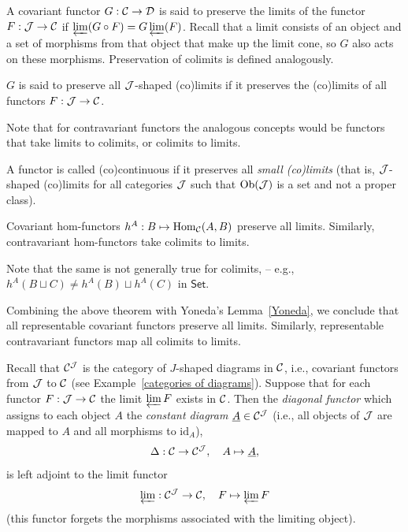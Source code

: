 \begin{defn}
    A covariant functor $G:\mathcal{C} \to\mathcal{D} $ is said to preserve the limits of the functor $F:\mathcal{J} \to \mathcal{C} $ if $\varprojlim(G\circ F)=G \varprojlim(F)$. Recall that a limit consists of an object and a set of morphisms from that object that make up the limit cone, so $G$ also acts on these morphisms. Preservation of colimits is defined analogously.

    $G$ is said to preserve all $\mathcal{J}$-shaped (co)limits if it preserves the (co)limits of all functors $F:\mathcal{J}\to \mathcal{C} $. 

    Note that for contravariant functors the analogous concepts would be functors that take limits to colimits, or colimits to limits.
\end{defn}    
\begin{defn}
    A functor is called (co)continuous if it preserves all \emph{small (co)limits} (that is, $\mathcal{J}$-shaped (co)limits for all categories $\mathcal{J}$ such that $\mathrm{Ob}(\mathcal{J})$ is a set and not a proper class).
\end{defn}
\begin{thm}
    Covariant hom-functors $h^A:B\mapsto\allowbreak \mathrm{Hom}_{\mathcal{C} }(A,B)$ preserve all limits. Similarly, contravariant hom-functors take colimits to limits.
\end{thm}
\begin{rem}
     Note that the same is not generally true for colimits, -- e.g., $h^A(B\sqcup C)\neq h^A(B)\sqcup h^A(C)$ in $\mathsf{Set}$.
\end{rem}
\begin{cor}
    Combining the above theorem with Yoneda's Lemma~\ref{Yoneda}, we conclude that all representable covariant functors preserve all limits. Similarly, representable contravariant functors map all colimits to limits.
\end{cor}
\begin{thm}\label{thm diagonal functor adjoint to limit}
    Recall that $\mathcal{C} ^{\mathcal{J}} $ is the category of $J$-shaped diagrams in $\mathcal{C} $, i.e., covariant functors from $\mathcal{J} $ to $\mathcal{C} $ (see Example~\ref{categories of diagrams}). Suppose that for each functor $F:\mathcal{J} \to\mathcal{C} $ the limit $\varprojlim F$ exists in $\mathcal{C} $. Then the \emph{diagonal functor} which assigns to each object $A$ the \emph{constant diagram} $\underline A\in \mathcal{C} ^{\mathcal{J}} $ (i.e., all objects of $\mathcal{J} $ are mapped to $A$ and all morphisms to $\mathrm{id}_A$),
    \[\Delta: \mathcal{C} \to \mathcal{C} ^{\mathcal{J}},\quad A\mapsto \underline{A},\]
    is left adjoint to the limit functor
    \[\varprojlim: \mathcal{C} ^{\mathcal{J}} \to \mathcal{C},\quad F\mapsto \varprojlim F\]
    (this functor forgets the morphisms associated with the limiting object).
\end{thm}
